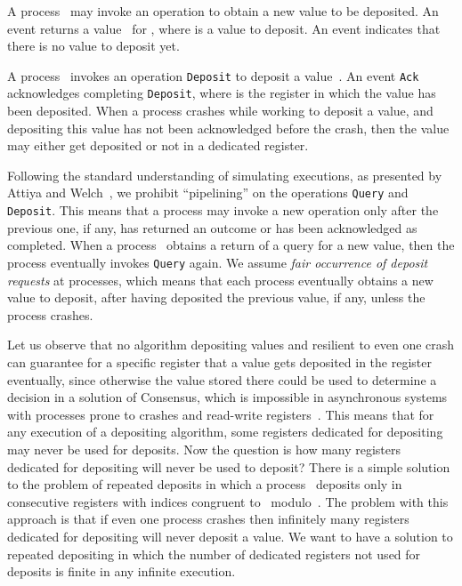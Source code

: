 \documentclass[11pt]{article}
\begin{document}
A process~ may invoke an operation  to obtain a new value to be deposited.
An event  returns a value~ for , where  is a value to deposit.
An event    indicates that there is no value to deposit yet.

A process~ invokes an operation \texttt{Deposit} to deposit a value~.
An event \texttt{Ack} acknowledges completing \texttt{Deposit}, where  is the register in which the value has been deposited.
When a process crashes while working to deposit a value, and depositing this value has not been acknowledged before the crash, then the value may either get deposited or not in a dedicated register.

Following the standard understanding of simulating executions, as presented by Attiya and Welch~\cite{Attiya-Welch-book2004}, we prohibit ``pipelining'' on the operations \texttt{Query} and \texttt{Deposit}.
This means that a process may invoke a new operation only after the previous one, if any, has returned an outcome or has been acknowledged as completed.
When a process~ obtains a return of a query for a new value, then the process  eventually invokes \texttt{Query} again.
We assume \emph{fair occurrence  of deposit requests} at processes, which means that each process eventually obtains a new value to deposit, after having deposited the previous value, if any, unless the process crashes.

Let us observe that no algorithm depositing values and resilient to even one crash can guarantee for a specific register that a value gets deposited in the register eventually, since otherwise the value stored there could be used to determine  a decision in a solution of Consensus, which is impossible in asynchronous systems with processes prone to crashes and read-write registers~\cite{Attiya-Welch-book2004,HerlihyKozlovRajsbaum-book,Lynch-book96}.
This means that for any execution of a depositing algorithm, some registers dedicated for depositing may never be used for deposits.
Now the question is how many registers dedicated for depositing will never be used to deposit?
There is a simple solution to the problem of repeated deposits in which a process~ deposits only in consecutive registers with indices congruent to~ modulo~.
The problem with this approach is that if even one process crashes then infinitely many registers dedicated for depositing will never deposit a value.
We want to have a solution to repeated depositing in which the number of dedicated registers not used for deposits is finite in any infinite execution.
\end{document}
